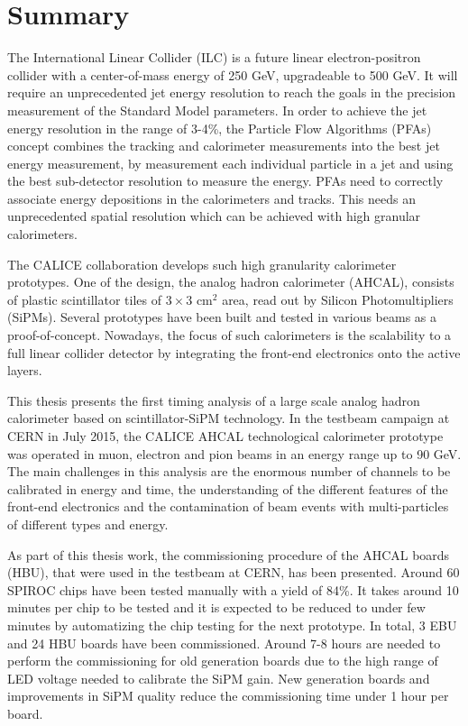 \chapter{Summary}

The International Linear Collider (ILC) is a future linear electron-positron collider with a center-of-mass energy of 250 GeV, upgradeable to 500 GeV. It will require an unprecedented jet energy resolution to reach the goals in the precision measurement of the Standard Model parameters. In order to achieve the jet energy resolution in the range of 3-4\%, the Particle Flow Algorithms (PFAs) concept combines the tracking and calorimeter measurements into the best jet energy measurement, by measurement each individual particle in a jet and using the best sub-detector resolution to measure the energy. PFAs need to correctly associate energy depositions in the calorimeters and tracks. This needs an unprecedented spatial resolution which can be achieved with high granular calorimeters.

The CALICE collaboration develops such high granularity calorimeter prototypes. One of the design, the analog hadron calorimeter (AHCAL), consists of plastic scintillator tiles of $3\times3$ cm$^2$ area, read out by Silicon Photomultipliers (SiPMs). Several prototypes have been built and tested in various beams as a proof-of-concept. Nowadays, the focus of such calorimeters is the scalability to a full linear collider detector by integrating the front-end electronics onto the active layers.

This thesis presents the first timing analysis of a large scale analog hadron calorimeter based on scintillator-SiPM technology. In the testbeam campaign at CERN in July 2015, the CALICE AHCAL technological calorimeter prototype was operated in muon, electron and pion beams in an energy range up to 90 GeV. The main challenges in this analysis are the enormous number of channels to be calibrated in energy and time, the understanding of the different features of the front-end electronics and the contamination of beam events with multi-particles of different types and energy.

As part of this thesis work, the commissioning procedure of the AHCAL boards (HBU), that were used in the testbeam at CERN, has been presented. Around 60 SPIROC chips have been tested manually with a yield of 84\%. It takes around 10 minutes per chip to be tested and it is expected to be reduced to under few minutes by automatizing the chip testing for the next prototype. In total, 3 EBU and 24 HBU boards have been commissioned. Around 7-8 hours are needed to perform the commissioning for old generation boards due to the high range of LED voltage needed to calibrate the SiPM gain. New generation boards and improvements in SiPM quality reduce the commissioning time under 1 hour per board.

